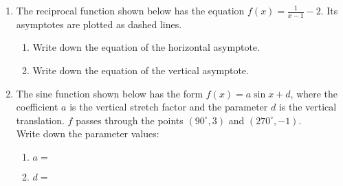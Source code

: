 \documentclass[12pt, twoside]{article}
\begin{document}
\begin{enumerate}
\item The reciprocal function shown below has the equation $\displaystyle f(x) =\frac{1}{x-1}-2$. Its asymptotes are plotted as dashed lines.
\begin{multicols}{2}
  \begin{enumerate}
    \item Write down the equation of the horizontal asymptote. \vspace{1cm}
    \item Write down the equation of the vertical asymptote. \vspace{2cm}
  \end{enumerate}
  \begin{flushright}
\end{flushright}
\end{multicols}

\item The sine function shown below has the form $f(x)=a \sin x + d$, where the coefficient $a$ is the vertical stretch factor and the parameter $d$ is the vertical translation. $f$ passes through the points $(90^\circ, 3)$ and $(270^\circ, -1)$.\\[0.25cm] Write down the parameter values:
\begin{multicols}{2}
  \begin{enumerate}
    \item $a=$ \vspace{1cm}
    \item $d=$
  \end{enumerate}\vspace{1cm}
  \begin{center}
  \end{center}
\end{multicols}

\end{enumerate}
\end{document}
